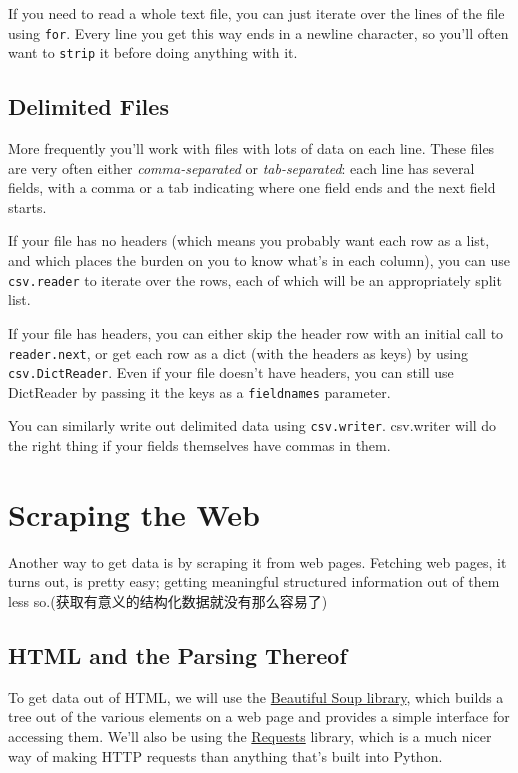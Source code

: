 If you need to read a whole text file, you can just iterate over the lines of the file using
\verb|for|. Every line you get this way ends in a newline character, so you'll often want to \verb|strip|
it before doing anything with it.

\subsection{Delimited Files}
More frequently you'll work with files with lots of data on each line. These files are
very often either \emph{comma-separated} or \emph{tab-separated}: each line has several fields, with a
comma or a tab indicating where one field ends and the next field starts.


If your file has no headers (which means you probably want each row as a list, and
which places the burden on you to know what's in each column), you can use
\verb|csv.reader| to iterate over the rows, each of which will be an appropriately split list.

If your file has headers, you can either skip the header row with an initial call to \verb|reader.next|, or get each
row as a dict (with the headers as keys) by using \verb|csv.DictReader|. Even if your file doesn't have headers, you can still use DictReader by passing it the
keys as a \verb|fieldnames| parameter.

You can similarly write out delimited data using \verb|csv.writer|. csv.writer will do the right thing if your fields themselves have commas in them.

\section{Scraping the Web}
Another way to get data is by scraping it from web pages. Fetching web pages, it turns
out, is pretty easy; getting meaningful structured information out of them less so.(获取有意义的结构化数据就没有那么容易了)
\subsection{HTML and the Parsing Thereof}

To get data out of HTML, we will use the \href{https://www.crummy.com/software/BeautifulSoup/}{Beautiful Soup library}, which builds a tree
out of the various elements on a web page and provides a simple interface for accessing them. We'll also be using the \href{https://docs.python-requests.org/en/latest/}{Requests} library, which is a much nicer way of making HTTP requests than anything that's built into Python.

